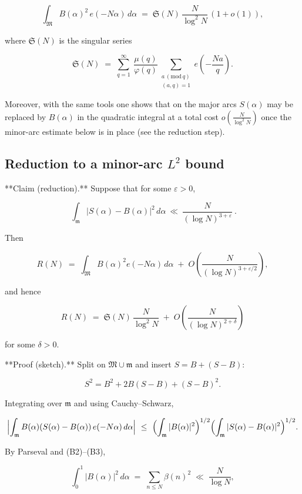 \documentclass[11pt]{article}
\theoremstyle{definition}
\theoremstyle{remark}
\begin{document}
$$
\int_{\mathfrak M} B(\alpha)^2\,e(-N\alpha)\,d\alpha
\;=\;\mathfrak S(N)\,\frac{N}{\log^2 N}\,(1+o(1)),
$$

where $\mathfrak S(N)$ is the singular series

$$
\mathfrak S(N)\;=\;\sum_{q=1}^{\infty}\ \frac{\mu(q)}{\varphi(q)}\!
\sum_{\substack{a\,(\mathrm{mod}\,q)\\(a,q)=1}} e\!\left(-\frac{Na}{q}\right).
$$

Moreover, with the same tools one shows that on the major arcs $S(\alpha)$ may be replaced by $B(\alpha)$ in the quadratic integral at a total cost $o\!\left(\tfrac{N}{\log^2 N}\right)$ once the minor-arc estimate below is in place (see the reduction step).


\subsection*{Reduction to a minor-arc $L^2$ bound}

**Claim (reduction).** Suppose that for some $\varepsilon>0$,

\begin{equation}
\boxed{\ \ \int_{\mathfrak m}\!\bigl|S(\alpha)-B(\alpha)\bigr|^{2}\,d\alpha
\ \ll\ \frac{N}{(\log N)^{3+\varepsilon}}\ .\ }
\tag{A.1}
\end{equation}


Then

$$
R(N)\;=\;\int_{\mathfrak M} B(\alpha)^2 e(-N\alpha)\,d\alpha\;+\;O\!\left(\frac{N}{(\log N)^{3+\varepsilon/2}}\right),
$$

and hence

$$
R(N)\;=\;\mathfrak S(N)\,\frac{N}{\log^{2}N}\;+\;O\!\left(\frac{N}{(\log N)^{2+\delta}}\right)
$$

for some $\delta>0$.

**Proof (sketch).** Split on $\mathfrak M\cup\mathfrak m$ and insert $S=B+(S-B)$:

$$
S^2 = B^2 + 2B(S-B) + (S-B)^2.
$$

Integrating over $\mathfrak m$ and using Cauchy–Schwarz,

$$
\Bigl|\int_{\mathfrak m} B(\alpha)(S(\alpha)-B(\alpha))\,e(-N\alpha)\,d\alpha\Bigr|
\ \le\ \Bigl(\int_{\mathfrak m}|B(\alpha)|^2\Bigr)^{1/2}
      \Bigl(\int_{\mathfrak m}|S(\alpha)-B(\alpha)|^2\Bigr)^{1/2}.
$$

By Parseval and (B2)–(B3),

$$
\int_0^1 |B(\alpha)|^2\,d\alpha \;=\; \sum_{n\le N}\beta(n)^2 \;\ll\; \frac{N}{\log N},
$$
\end{document}

